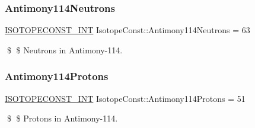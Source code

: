 \subsubsection{\texorpdfstring{Antimony114\+Neutrons}{Antimony114Neutrons}}
{\footnotesize\ttfamily \mbox{\hyperlink{group___isotope_const-_macros_ga5f18360b3e99483a35c32d789e62621c}{I\+S\+O\+T\+O\+P\+E\+C\+O\+N\+S\+T\+\_\+\+I\+NT}} Isotope\+Const\+::\+Antimony114\+Neutrons = 63}

\$ \$ Neutrons in Antimony-\/114. \mbox{\label{group___isotope_const-_antimony-_sb114_ga998c15046af1f33997df255175b25a77}} 
\subsubsection{\texorpdfstring{Antimony114\+Protons}{Antimony114Protons}}
{\footnotesize\ttfamily \mbox{\hyperlink{group___isotope_const-_macros_ga5f18360b3e99483a35c32d789e62621c}{I\+S\+O\+T\+O\+P\+E\+C\+O\+N\+S\+T\+\_\+\+I\+NT}} Isotope\+Const\+::\+Antimony114\+Protons = 51}

\$ \$ Protons in Antimony-\/114. 